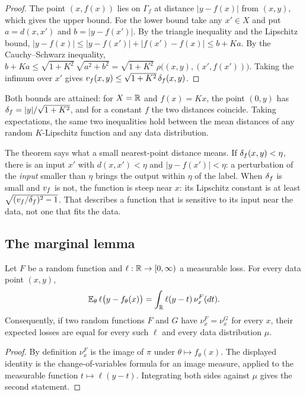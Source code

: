 \begin{proof}
The point $(x,f(x))$ lies on $\Gamma_f$ at distance $|y-f(x)|$ from $(x,y)$,
which gives the upper bound. For the lower bound take any $x'\in X$ and put
$a=d(x,x')$ and $b=|y-f(x')|$. By the triangle inequality and the Lipschitz
bound, $|y-f(x)|\le|y-f(x')|+|f(x')-f(x)|\le b+Ka$. By the Cauchy--Schwarz
inequality, $b+Ka\le\sqrt{1+K^2}\,\sqrt{a^2+b^2}=\sqrt{1+K^2}\;\rho\bigl((x,y),(x',f(x'))\bigr)$.
Taking the infimum over $x'$ gives $v_f(x,y)\le\sqrt{1+K^2}\,\delta_f(x,y)$.
\end{proof}

Both bounds are attained: for $X=\mathbb{R}$ and $f(x)=Kx$, the point $(0,y)$ has
$\delta_f=|y|/\sqrt{1+K^2}$, and for a constant $f$ the two distances coincide.
Taking expectations, the same two inequalities hold between the mean distances
of any random $K$-Lipschitz function and any data distribution.

The theorem says what a small nearest-point distance means. If
$\delta_f(x,y)<\eta$, there is an input $x'$ with $d(x,x')<\eta$ and
$|y-f(x')|<\eta$: a perturbation of the \emph{input} smaller than $\eta$ brings
the output within $\eta$ of the label. When $\delta_f$ is small and $v_f$ is not,
the function is steep near $x$: its Lipschitz constant is at least
$\sqrt{(v_f/\delta_f)^2-1}$. That describes a function that is
sensitive to its input near the data, not one that fits the data.

\subsection{The marginal lemma}

\begin{theorem}\label{thm:marginal}
Let $F$ be a random function and $\ell:\mathbb{R}\to[0,\infty)$ a measurable loss. For
every data point $(x,y)$,
\[
  \mathbb{E}_{\theta}\,\ell\bigl(y-f_\theta(x)\bigr)=\int_{\mathbb{R}}\ell(y-t)\,\nu^F_x(dt).
\]
Consequently, if two random functions $F$ and $G$ have $\nu^F_x=\nu^G_x$ for
every $x$, their expected losses are equal for every such $\ell$ and every data
distribution $\mu$.
\end{theorem}

\begin{proof}
By definition $\nu^F_x$ is the image of $\pi$ under $\theta\mapsto f_\theta(x)$.
The displayed identity is the change-of-variables formula for an image measure,
applied to the measurable function $t\mapsto\ell(y-t)$. Integrating both sides
against $\mu$ gives the second statement.
\end{proof}

